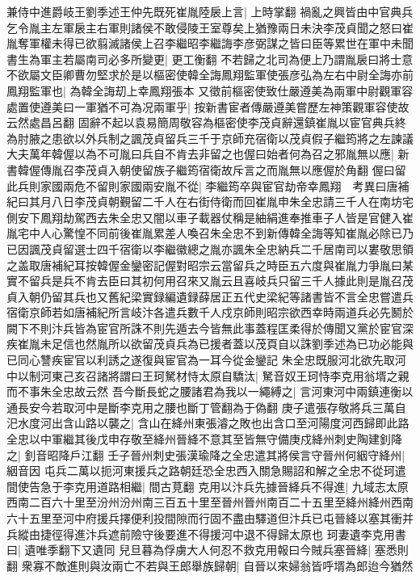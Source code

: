 兼侍中進爵岐王劉季述王仲先既死崔胤陸扆上言|{
	上時掌翻}
禍亂之興皆由中官典兵乞令胤主左軍扆主右軍則諸侯不敢侵陵王室尊矣上猶豫兩日未決李茂貞聞之怒曰崔胤奪軍權未得已欲翦滅諸侯上召李繼昭李繼誨李彦弼謀之皆曰臣等累世在軍中未聞書生為軍主若屬南司必多所變更|{
	更工衡翻}
不若歸之北司為便上乃謂胤扆曰將士意不欲屬文臣卿曹勿堅求於是以樞密使韓全誨鳳翔監軍使張彦弘為左右中尉全誨亦前鳳翔監軍也|{
	為韓全誨刧上幸鳳翔張本}
又徵前樞密使致仕嚴遵美為兩軍中尉觀軍容處置使遵美曰一軍猶不可為况兩軍乎|{
	按新書宦者傳嚴遵美嘗歷左神策觀軍容使故云然處昌呂翻}
固辭不起以袁易簡周敬容為樞密使李茂貞辭還鎮崔胤以宦官典兵終為肘腋之患欲以外兵制之諷茂貞留兵三千于京師充宿衛以茂貞假子繼筠將之左諫議大夫萬年韓偓以為不可胤曰兵自不肯去非留之也偓曰始者何為召之邪胤無以應|{
	新書韓偓傳胤召李茂貞入朝使留族子繼筠宿衛故斥言之而胤無以應偓於角翻}
偓曰留此兵則家國兩危不留則家國兩安胤不從|{
	李繼筠卒與宦官劫帝幸鳳翔　考異曰唐補紀曰其月八日李茂貞朝覲留二千人在右街侍衛而回崔胤申朱全忠請三千人在南坊宅側安下鳳翔劫駕西去朱全忠又闇以車子載器仗稱是紬絹進奉推車子人皆是官健入崔胤宅中人心驚惶不同前後崔胤累差人喚召朱全忠不到新傳韓全誨等知崔胤必除已乃已因諷茂貞留選士四千宿衛以李繼徽總之胤亦諷朱全忠納兵二千居南司以婁敬思領之盖取唐補紀耳按韓偓金鑾密記偓對昭宗云當留兵之時臣五六度與崔胤力爭胤曰某實不留兵是兵不肯去臣曰其初何用召來又胤云且喜岐兵只留三千人據此則是胤召茂貞入朝仍留其兵也又舊紀梁實録編遺録薛居正五代史梁紀等諸書皆不言全忠嘗遣兵宿衛京師若如唐補紀所言岐汴各遣兵數千人戍京師則昭宗欲西幸時兩道兵必先鬭於闕下不則汴兵皆為宦官所誅不則先遁去今皆無此事蓋程匡柔得於傳聞又黨於宦官深疾崔胤未足信也然胤所以欲留茂貞兵為已援者蓋以茂頁自以誅劉季述為已功必能與已同心讐疾宦官以利誘之遂復與宦官為一耳今從金鑾記}
朱全忠既服河北欲先取河中以制河東己亥召諸將謂曰王珂駑材恃太原自驕汰|{
	駑音奴王珂恃李克用翁壻之親而不事朱全忠故云然}
吾今斷長蛇之腰諸君為我以一繩縛之|{
	言河東河中兩鎮連衡以通長安今若取河中是斷李克用之腰也斷丁管翻為于偽翻}
庚子遣張存敬將兵三萬自汜水度河出含山路以襲之|{
	含山在絳州東張濬之敗也出含口至河陽度河西歸即此路}
全忠以中軍繼其後戊申存敬至絳州晉絳不意其至皆無守備庚戍絳州刺史陶建釗降之|{
	釗音昭降戶江翻}
壬子晉州刺史張漢瑜降之全忠遣其將侯言守晉州何絪守絳州|{
	絪音因}
屯兵二萬以扼河東援兵之路朝廷恐全忠西入關急賜詔和解之全忠不從珂遣間使告急于李克用道路相繼|{
	間古莧翻}
克用以汴兵先據晉絳兵不得進|{
	九域志太原西南二百六十里至汾州汾州南三百五十里至晉州晉州南百二十五里至絳州絳州西南六十五里至河中府援兵擇便利投間隙而行固不盡由驛道但汴兵已屯晉絳以塞其衝并兵縱由捷徑得進汴兵遮前險守後要進不得援河中退不得歸太原也}
珂妻遺李克用書曰|{
	遺唯季翻下又遺同}
兒旦暮為俘虜大人何忍不救克用報曰今賊兵塞晉絳|{
	塞悉則翻}
衆寡不敵進則與汝兩亡不若與王郎舉族歸朝|{
	自晉以來婦翁皆呼壻為郎迨今猶然}
